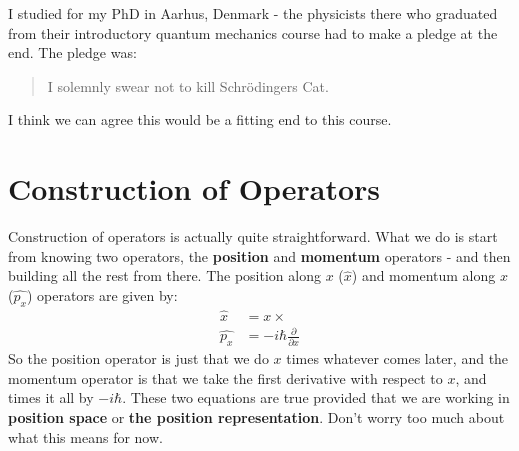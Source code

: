 \documentclass{memoir}[11pt,oneside,a4paper,openany]
\begin{document}
I studied for my PhD in Aarhus, Denmark - the physicists there who graduated from their introductory quantum mechanics course had to make a pledge at the end. The pledge was:
\begin{quote}
	I solemnly swear not to kill Schr{\"o}dingers Cat.
\end{quote}
I think we can agree this would be a fitting end to this course.
















\appendixpage
\appendix
\chapter{Construction of Operators}
Construction of operators is actually quite straightforward. What we do is start from knowing two operators, the \textbf{position} and \textbf{momentum} operators - and then building all the rest from there. The position along $x$ ($\hat{x}$) and momentum along $x$ ($\hat{p_x}$) operators are given by:
\begin{align}
	\hat{x} &= x\times\\
	\hat{p_x} &= -i\hbar \frac{\partial}{\partial x}
\end{align}
So the position operator is just that we do $x$ times whatever comes later, and the momentum operator is that we take the first derivative with respect to $x$, and times it all by $-i\hbar$. These two equations are true provided that we are working in \textbf{position space} or \textbf{the position representation}. Don't worry too much about what this means for now. 
\end{document}
